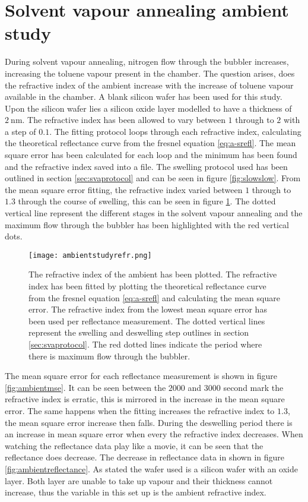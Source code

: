 \documentclass[MasterThesisMain.tex]{subfiles}
\begin{document}
\section{Solvent vapour annealing ambient study}
During solvent vapour annealing, nitrogen flow through the bubbler increases, increasing the toluene vapour present in the chamber. The question arises, does the refractive index of the ambient increase with the increase of toluene vapour available in the chamber. A blank silicon wafer has been used for this study. Upon the silicon wafer lies a silicon oxide layer modelled to have a thickness of $\SI{2}{\nano\meter}$. The refractive index has been allowed to vary between $1$ through to $2$ with a step of $0.1$. The fitting protocol loops through each refractive index, calculating the theoretical reflectance curve from the fresnel equation \ref{eq:a-srefl}. The mean square error has been calculated for each loop and the minimum has been found and the refractive index saved into a file. The swelling protocol used has been outlined in section \ref{sec:svaprotocol} and can be seen in figure \ref{fig:slowslow}. From the mean square error fitting, the refractive index varied between $1$ through to $1.3$ through the course of swelling, this can be seen in figure \ref{fig:ambientrefr}. The dotted vertical line represent the different stages in the solvent vapour annealing and the maximum flow through the bubbler has been highlighted with the red vertical dots.

\begin{figure}
\centering
\texttt{[image: ambientstudyrefr.png]}
\caption{The refractive index of the ambient has been plotted. The refractive index has been fitted by plotting the theoretical reflectance curve from the fresnel equation \ref{eq:a-srefl} and calculating the mean square error. The refractive index from the lowest mean square error has been used per reflectance measurement. The dotted vertical lines represent the swelling and deswelling step outlines in section \ref{sec:svaprotocol}. The red dotted lines indicate the period where there is maximum flow through the bubbler.}
\label{fig:ambientrefr}
\end{figure}

The mean square error for each reflectance measurement is shown in figure \ref{fig:ambientmse}. It can be seen between the $2000$ and $3000$ second mark the refractive index is erratic, this is mirrored in the increase in the mean square error. The same happens when the fitting increases the refractive index to $1.3$, the mean square error increase then falls. During the deswelling period there is an increase in mean square error when every the refractive index decreases. When watching the reflectance data play like a movie, it can be seen that the reflectance does decrease. The decrease in reflectance data in shown in figure \ref{fig:ambientreflectance}. As stated the wafer used is a silicon wafer with an oxide layer. Both layer are unable to take up vapour and their thickness cannot increase, thus the variable in this set up is the ambient refractive index.
\end{document}
